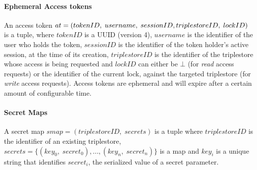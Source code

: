 \paragraph*{Ephemeral Access tokens} An access token $at = (tokenID, \; username, \; sessionID, \linebreak triplestoreID, \; lockID)$ is a tuple, where $tokenID$ is a \gls{UUID} (version 4), $username$ is the identifier of the user who holds the token, $sessionID$ is the identifier of the token holder's active session, at the time of its creation, $triplestoreID$ is the identifier of the triplestore whose access is being requested and $lockID$ can either be $\bot$ (for \emph{read} access requests) or the identifier of the current lock, against the targeted triplestore (for \emph{write} access requests). Access tokens are ephemeral and will expire after a certain amount of configurable time.

\paragraph*{Secret Maps} A secret map $smap = (triplestoreID, \; secrets)$ is a tuple where $triplestoreID$ is the identifier of an existing triplestore, $secrets = \{(key_0, \; secret_0), ..., \allowbreak (key_n, \; secret_n)\}$ is a map and $key_i$ is a unique string that identifies $secret_i$, the serialized value of a secret parameter.

